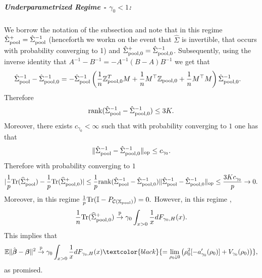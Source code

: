 \documentclass{article}
\theoremstyle{plain}
\theoremstyle{remark}
\def \bbeta{\boldsymbol{\beta}}
\def \bbeta{\boldsymbol{\beta}}
\def \Xm {\mathbb{X}_{\rm pool}}
\def \tr {\mathrm{Tr}}
\def \I{\mathcal{I}}
\def \E{\mathbb{E}}
\def \P{\mathbb{P}}
\def \I {\mathbb{I}}
\begin{document}
\subparagraph{Underparametrized Regime - $\gamma_0<1$:} We borrow the notation of the subsection and note that in this regime $\hat{\Sigma}_{\rm pool}^+=\hat{\Sigma}_{\rm pool}^{-1}$ (henceforth we workn on the event that $\hat{\Sigma}$ is invertible, that occurs with probability converging to 1) and $\hat{\Sigma}_{\rm pool,0}^+=\hat{\Sigma}_{\rm pool,0}^{-1}$. Subsequently, using the inverse identity that $A^{-1}-B^{-1}=-A^{-1}(B-A)B^{-1}$ we get that
\begin{align*}
    \hat{\Sigma}_{\rm pool}^{-1}-\hat{\Sigma}_{\rm pool,0}^{-1}&=- \hat{\Sigma}_{\rm pool}^{-1}\left(\frac{1}{n}\mathbb{Z}_{\rm pool,0}^T M+\frac{1}{n}M^\top\mathbb{Z}_{\rm pool,0}+\frac{1}{n}M^\top M\right)\hat{\Sigma}_{\rm pool,0}^{-1}.
\end{align*}
Therefore
\begin{align*}
    \mathrm{rank}(\hat{\Sigma}_{\rm pool}^{-1}-\hat{\Sigma}_{\rm pool,0}^{-1})\leq 3K.
\end{align*}
Moreover, there exists $c_{\gamma_0}<\infty$ such that with probability converging to $1$ \citep{bai2010spectral} one has that
\begin{align*}
    \|\hat{\Sigma}_{\rm pool}^{-1}-\hat{\Sigma}_{\rm pool,0}^{-1}\|_{\rm op}\leq c_{\gamma_0}.
\end{align*}
Therefore with probability converging to $1$ 
\begin{align*}
    |\frac{1}{p}\tr(\widehat{\Sigma}_{\rm pool}^+)-\frac{1}{p}\tr(\widehat{\Sigma}_{\rm pool,0}^+)|\leq \frac{1}{p}\mathrm{rank}(\hat{\Sigma}_{\rm pool}^{-1}-\hat{\Sigma}_{\rm pool,0}^{-1})\|\hat{\Sigma}_{\rm pool}^{-1}-\hat{\Sigma}_{\rm pool,0}^{-1}\|_{\rm op}\leq \frac{3Kc_{\gamma_0}}{p}\to 0.
\end{align*}
Moreover, in this regime $\frac{1}{p}\tr(\I-P_{\mathcal{C}(\Xm)})=0.$ However, in this regime \citep{hastie2019surprises},
\begin{align*}
    \frac{1}{n}\tr(\widehat{\Sigma}_{\rm pool,0}^+)\stackrel{\P}{\to} \gamma_0\int_{x>0}\frac{1}{x}dF_{\gamma_0,H}(x).
\end{align*}
This implies that
\begin{align*}
    \E\|\hat{\bbeta}-\bbeta\|^2 \stackrel{\P}{\to} \gamma_0\int_{x>0}\frac{1}{x}dF_{\gamma_0,H}(x)\textcolor{black}{=\lim_{\rho_0\downarrow 0}\left(\rho_0^2[-a_{\gamma_0}'(\rho_0)]
    +
    V_{\gamma_0}(\rho_0)\right)},
\end{align*}
as promised.
\end{document}
